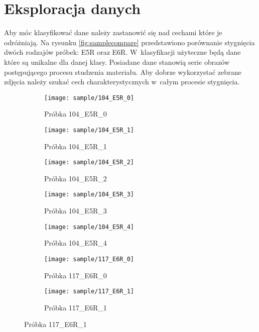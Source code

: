 \section{Eksploracja danych}
Aby móc klasyfikować dane należy zastanowić się nad cechami które je
odróżniają.
Na rysunku \ref{fig:samplecompare} przedstawiono porównanie stygnięcia
dwóch rodzajów próbek: E5R oraz E6R.
W~klasyfikacji użyteczne będą dane które są unikalne dla danej klasy.
Posiadane dane stanowią serie obrazów postępującego procesu studzenia
materiału.
Aby dobrze wykorzystać zebrane zdjęcia należy szukać cech charakterystycznych
w~całym procesie stygnięcia.
\begin{figure}[htbp]
	\centering
	\begin{subfigure}{0.3\textwidth}
		\centering
		\texttt{[image: sample/104\_E5R\_0]}
		\caption{Próbka 104\_E5R\_0}
	\end{subfigure}
	\hspace{0.25cm}
	\vspace{0.5cm}
	\begin{subfigure}{0.3\textwidth}
		\centering
		\texttt{[image: sample/104\_E5R\_1]}
		\caption{Próbka 104\_E5R\_1}
	\end{subfigure}
	\hspace{0.25cm}
	\begin{subfigure}{0.3\textwidth}
		\centering
		\texttt{[image: sample/104\_E5R\_2]}
		\caption{Próbka 104\_E5R\_2}
	\end{subfigure}
	\begin{subfigure}{0.3\textwidth}
		\centering
		\texttt{[image: sample/104\_E5R\_3]}
		\caption{Próbka 104\_E5R\_3}
	\end{subfigure}
	\hspace{0.25cm}
	\vspace{0.5cm}
	\begin{subfigure}{0.3\textwidth}
		\centering
		\texttt{[image: sample/104\_E5R\_4]}
		\caption{Próbka 104\_E5R\_4}
	\end{subfigure}
	\hspace{0.25cm}
	\begin{subfigure}{0.3\textwidth}
		\centering
		\texttt{[image: sample/117\_E6R\_0]}
		\caption{Próbka 117\_E6R\_0}
	\end{subfigure}
	\begin{subfigure}{0.3\textwidth}
		\centering
		\texttt{[image: sample/117\_E6R\_1]}
		\caption{Próbka 117\_E6R\_1}

\end{subfigure}
\end{figure}

